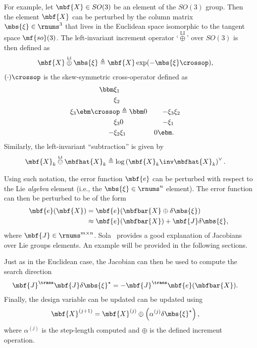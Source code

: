\documentclass[ nobib, nofonts, notoc]{tufte-handout}
\newcommand{\liplus}{\overset{{\scriptscriptstyle\mathrm{LI}}}{\oplus}}
\newcommand{\liminus}{\overset{{\scriptscriptstyle\mathrm{LI}}}{\ominus}}
\begin{document}
    For example, let $\mbf{X}\in SO(3)$ be an element of the $SO(3)$ group.
    Then the element $\mbf{X}$ can be perturbed by the column matrix $\mbs{\xi}\in\rnums^{3}$ that lives in the Euclidean space isomorphic to the tangent space $\mf{so}(3)$.
    The left-invariant increment operator `$\liplus$' over $SO(3)$ is then defined as
    \begin{align}
        \mbf{X} \liplus \mbs{\xi} &\triangleq \mbf{X}\exp(-\mbs{\xi}\crossop),
    \end{align}
        $(\cdot)\crossop$ is the skew-symmetric cross-operator defined as \cite{Barfoot_State_2017a}
    \begin{align}
        \bbm
            \xi_{1}\\
            \xi_{2}\\
            \xi_{3}
        \ebm\crossop
        &\triangleq
        \bbm
            0 & -\xi_{3} & \xi_{2} \\
            \xi_{3} & 0 & -\xi_{1}\\
            -\xi_{2} & \xi_{1} & 0
        \ebm.
    \end{align}
    Similarly, the left-invariant ``subtraction'' is given by
    \begin{align}
      \label{eq:liminus definition}
      \mbf{X}_{k} \liminus \mbfhat{X}_{k}
      &\triangleq
      \log\left( 
          \mbf{X}_{k}\inv
          \mbfhat{X}_{k}
       \right)^{\vee}.
    \end{align}

    Using such notation, the error function $\mbf{e}$ can be perturbed with respect to the Lie \emph{algebra} element (i.e., the $\mbs{\xi}\in\rnums^{n}$ element).
    The error function can then be perturbed to be of the form
    \begin{align}
        \mbf{e}(\mbf{X})
        &= \mbf{e}(\mbfbar{X}\oplus \delta\mbs{\xi})\\
        &\approx \mbf{e}(\mbfbar{X}) + \mbf{J}\delta\mbs{\xi},
    \end{align}
    where $\mbf{J}\in\rnums^{m\times n}$.
    Sola~\cite{Sola_micro_2019} provides a good explanation of Jacobians over Lie groups elements.
    An example will be provided in the following sections.

    Just as in the Euclidean case, the Jacobian can then be used to compute the search direction
    \begin{align}
        \mbf{J}^{\trans}\mbf{J}\delta\mbs{\xi}^{\star} &= -\mbf{J}^{\trans}\mbf{e}(\mbfbar{X}).
    \end{align}
    Finally, the design variable can be updated can be updated using
    \begin{align}
        \mbf{X}^{(j+1)} &= \mbf{X}^{(j)}\oplus \left( \alpha^{(j)}\delta\mbs{\xi}^{\star} \right),
    \end{align}
    where $\alpha^{(j)}$ is the step-length computed and $\oplus$ is the defined increment operation.
\end{document}
